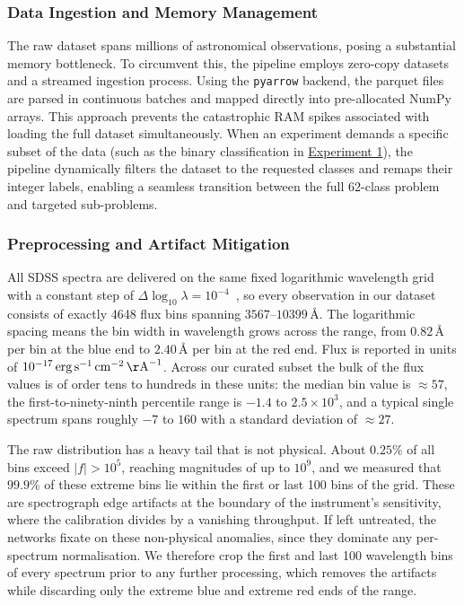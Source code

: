 \subsubsection{Data Ingestion and Memory Management}
The raw dataset spans millions of astronomical observations, posing a substantial memory bottleneck. To circumvent this, the pipeline employs zero-copy datasets and a streamed ingestion process. Using the \texttt{pyarrow} backend, the parquet files are parsed in continuous batches and mapped directly into pre-allocated NumPy arrays. This approach prevents the catastrophic RAM spikes associated with loading the full dataset simultaneously. When an experiment demands a specific subset of the data (such as the binary classification in \hyperref[sec:exp1_methods]{Experiment 1}), the pipeline dynamically filters the dataset to the requested classes and remaps their integer labels, enabling a seamless transition between the full 62-class problem and targeted sub-problems.

\subsubsection{Preprocessing and Artifact Mitigation}
All SDSS spectra are delivered on the same fixed logarithmic wavelength grid with a
constant step of $\Delta \log_{10} \lambda = 10^{-4}$~\cite{smee2013spectrographs}, so
every observation in our dataset consists of exactly 4648 flux bins spanning
$3567$--$10399$\,\AA. The logarithmic spacing means the bin width in wavelength grows
across the range, from $0.82$\,\AA{} per bin at the blue end to $2.40$\,\AA{} per bin at
the red end. Flux is reported in units of
$10^{-17}\,\mathrm{erg}\,\mathrm{s}^{-1}\,\mathrm{cm}^{-2}\,\mathrm{\AA}^{-1}$. Across our
curated subset the bulk of the flux values is of order tens to hundreds in these units:
the median bin value is $\approx 57$, the first-to-ninety-ninth percentile range is
$-1.4$ to $2.5 \times 10^{3}$, and a typical single spectrum spans roughly $-7$ to $160$
with a standard deviation of $\approx 27$.

The raw distribution has a heavy tail that is not physical. About $0.25\%$ of all bins
exceed $|f| > 10^{5}$, reaching magnitudes of up to $10^{9}$, and we measured that
$99.9\%$ of these extreme bins lie within the first or last 100 bins of the grid. These
are spectrograph edge artifacts at the boundary of the instrument's sensitivity, where
the calibration divides by a vanishing throughput. If left untreated, the networks fixate
on these non-physical anomalies, since they dominate any per-spectrum normalisation. We
therefore crop the first and last 100 wavelength bins of every spectrum prior to any
further processing, which removes the artifacts while discarding only the extreme blue
and extreme red ends of the range.

